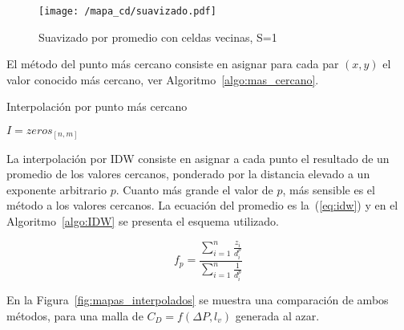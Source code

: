 \begin{figure}
    \centering
    \texttt{[image: /mapa\_cd/suavizado.pdf]}
    \caption{Suavizado por promedio con celdas vecinas, S=1}\label{fig:suavizado_promedio}
\end{figure}


El método del punto más cercano consiste en asignar para cada par $(x, y)$ el
valor conocido más cercano, ver Algoritmo~\ref{algo:mas_cercano}.

\begin{algorithm}
 \caption{Interpolación por punto más cercano}\label{algo:mas_cercano}


    \BlankLine
     $I=zeros_{[n,m]}$\;
\end{algorithm}

La interpolación por IDW consiste en asignar a cada punto el resultado de un
promedio de los valores cercanos, ponderado por la distancia elevado a un
exponente arbitrario $p$.
%
Cuanto más grande el valor de $p$, más sensible es el método a los valores
cercanos.
%
La ecuación del promedio es la~(\ref{eq:idw}) y en el Algoritmo~\ref{algo:IDW}
se presenta el esquema utilizado.
%

\begin{equation} \label{eq:idw}
    f_p = \frac{\sum_{i=1}^{n} \frac{z_i}{d_i^p}} {\sum_{i=1}^{n}
    \frac{1}{d_i^p}}
\end{equation}

En la Figura~\ref{fig:mapas_interpolados} se muestra una comparación de ambos
métodos, para una malla de $C_{D}=f(\Delta P, l_{v})$ generada al azar.

